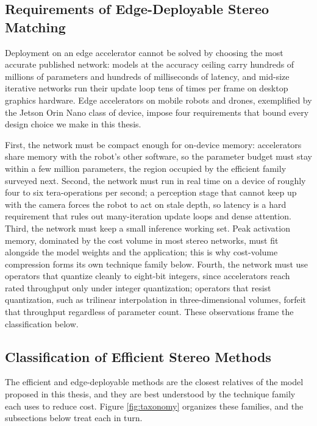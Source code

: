 \FloatBarrier
\subsection{Requirements of Edge-Deployable Stereo Matching}
\label{sec:edge_requirements}
Deployment on an edge accelerator cannot be solved by choosing the most
accurate published network: models at the accuracy ceiling carry
hundreds of millions of parameters and hundreds of milliseconds of
latency, and mid-size iterative networks run their update loop tens of
times per frame on desktop graphics hardware. Edge accelerators on
mobile robots and drones, exemplified by the Jetson Orin Nano class of
device, impose four requirements that bound every design choice we make
in this thesis.

First, the network must be compact enough for on-device memory:
accelerators share memory with the robot's other software, so the
parameter budget must stay within a few million parameters, the region
occupied by the efficient family surveyed next. Second, the
network must run in real time on a device of roughly four to six
tera-operations per second; a perception stage that cannot keep up
with the camera forces the robot to act on stale depth, so latency is
a hard requirement that rules out many-iteration update loops and
dense attention. Third, the network must keep a small inference
working set. Peak activation memory, dominated by the cost volume in
most stereo networks, must fit alongside the model weights and the
application; this is why cost-volume compression forms its own
technique family below. Fourth, the network must use operators that
quantize cleanly to eight-bit integers, since accelerators reach rated
throughput only under integer quantization; operators that resist
quantization, such as trilinear interpolation in three-dimensional
volumes, forfeit that throughput regardless of parameter count. These
observations frame the classification below.

\FloatBarrier
\subsection{Classification of Efficient Stereo Methods}
\label{sec:classification}
The efficient and edge-deployable methods are the closest relatives of the
model proposed in this thesis, and they are best understood by the
technique family each uses to reduce cost. Figure \ref{fig:taxonomy}
organizes these families, and the subsections below treat each in turn.

